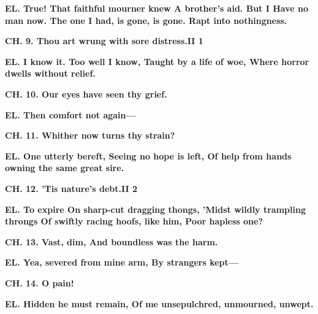 \documentclass[11pt,letter]{book}
\begin{document}
\par \textbf{EL. True! That faithful mourner knew A brother’s aid. But I Have no man now. The one I had, is gone, is gone. Rapt into nothingness.}
\par 

\par \textbf{CH. 9. Thou art wrung with sore distress.II 1}
\par 

\par \textbf{EL. I know it. Too well I know, Taught by a life of woe, Where horror dwells without relief.}
\par 

\par \textbf{CH. 10. Our eyes have seen thy grief.}
\par 

\par \textbf{EL. Then comfort not again—}
\par 

\par \textbf{CH. 11. Whither now turns thy strain?}
\par 

\par \textbf{EL. One utterly bereft, Seeing no hope is left, Of help from hands owning the same great sire.}
\par 

\par \textbf{CH. 12. ’Tis nature’s debt.II 2}
\par 

\par \textbf{EL. To expire On sharp-cut dragging thongs, ’Midst wildly trampling throngs Of swiftly racing hoofs, like him, Poor hapless one?}
\par 

\par \textbf{CH. 13. Vast, dim, And boundless was the harm.}
\par 

\par \textbf{EL. Yea, severed from mine arm, By strangers kept—}
\par 

\par \textbf{CH. 14. O pain!}
\par 

\par \textbf{EL. Hidden he must remain, Of me unsepulchred, unmourned, unwept.}
\par 
\end{document}
